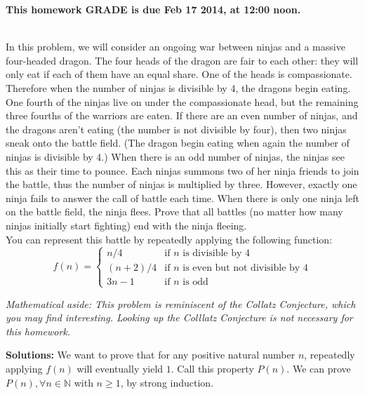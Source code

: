 \documentclass[11pt]{article}
\newif\ifsolutions
\renewcommand{\answer}[1]{{\color{mydarkblue}\textbf{Solutions: }#1}}
\begin{document}
\maketitle

\vspace{0.5em}
{\Large{\textbf{This homework GRADE is due Feb 17 2014, at 12:00 noon.}}}


\begin{qunlist}

 \\ 
In this problem, we will consider an ongoing war between ninjas and a massive four-headed dragon. 
The four heads of the dragon are fair to each other: 
they will only eat if each of them have an equal share. One of the heads is compassionate. 
Therefore when the number of ninjas is divisible by 4, the dragons begin eating.  
One fourth of the ninjas live on under the compassionate head, 
but the remaining three fourths of the warriors are eaten. 
If there are an even number of ninjas, and the dragons aren't eating 
(the number is not divisible by four), then two ninjas sneak onto the battle field. 
(The dragon begin eating when again the number of ninjas is divisible by 4.)
When there is an odd number of ninjas, the ninjas see this as their time to pounce. 
Each ninjas summons two of her ninja friends to join the battle, 
thus the number of ninjas is multiplied by three. 
However, exactly one ninja fails to answer the call of battle each time. 
When there is only one ninja left on the battle field, the ninja flees. 
Prove that all battles (no matter how many ninjas initially start fighting) 
end with the ninja fleeing. \\
You can represent this battle by repeatedly applying the following function:
\[ f(n) = \left\{ 
    \begin{array}{cl} 
        n/4 & \text{if $n$ is divisible by 4} \\
        (n+2)/4 & \text{if $n$ is even but not divisible by 4} \\
        3n - 1 & \text{if $n$ is odd} 
    \end{array} 
\right. \]

\textit{Mathematical aside: This problem is reminiscent of the Collatz Conjecture, which you may find interesting. Looking up the Colllatz Conjecture is not necessary for this homework.}

\ifsolutions
\answer{
We want to prove that for any positive natural number $n$, repeatedly applying $f(n)$ will eventually yield $1$. 
Call this property $P(n)$. We can prove $P(n), \forall n \in \mathbb{N}$ with $n \geq 1$, by strong induction.

}
\end{qunlist}
\end{document}
